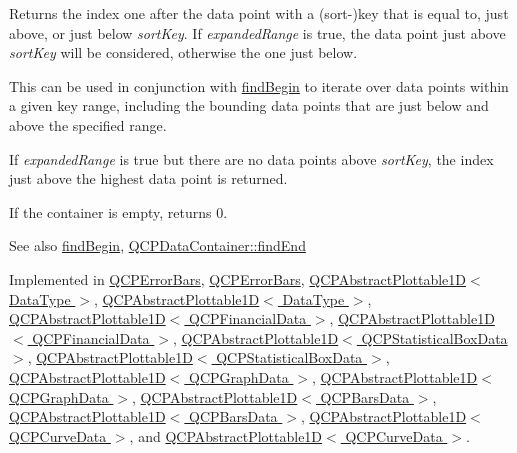 Returns the index one after the data point with a (sort-\/)key that is equal to, just above, or just below {\itshape sort\+Key}. If {\itshape expanded\+Range} is true, the data point just above {\itshape sort\+Key} will be considered, otherwise the one just below.

This can be used in conjunction with \hyperlink{class_q_c_p_plottable_interface1_d_a5b95783271306a4de97be54eac1e7d13}{find\+Begin} to iterate over data points within a given key range, including the bounding data points that are just below and above the specified range.

If {\itshape expanded\+Range} is true but there are no data points above {\itshape sort\+Key}, the index just above the highest data point is returned.

If the container is empty, returns 0.

\begin{DoxySeeAlso}{See also}
\hyperlink{class_q_c_p_plottable_interface1_d_a5b95783271306a4de97be54eac1e7d13}{find\+Begin}, \hyperlink{class_q_c_p_data_container_afb8b8f23cc2b7234a793a25ce79fe48f}{Q\+C\+P\+Data\+Container\+::find\+End} 
\end{DoxySeeAlso}


Implemented in \hyperlink{class_q_c_p_error_bars_a64629f13bb290d41dd8f1b37346bfdd4}{Q\+C\+P\+Error\+Bars}, \hyperlink{class_q_c_p_error_bars_a5a529f3a9e71b6c29f8a0397d570489e}{Q\+C\+P\+Error\+Bars}, \hyperlink{class_q_c_p_abstract_plottable1_d_ad913df7f02add35150779dce3913aeae}{Q\+C\+P\+Abstract\+Plottable1\+D$<$ Data\+Type $>$}, \hyperlink{class_q_c_p_abstract_plottable1_d_a02434e0e5599cd072225692f3469750b}{Q\+C\+P\+Abstract\+Plottable1\+D$<$ Data\+Type $>$}, \hyperlink{class_q_c_p_abstract_plottable1_d_ad913df7f02add35150779dce3913aeae}{Q\+C\+P\+Abstract\+Plottable1\+D$<$ Q\+C\+P\+Financial\+Data $>$}, \hyperlink{class_q_c_p_abstract_plottable1_d_a02434e0e5599cd072225692f3469750b}{Q\+C\+P\+Abstract\+Plottable1\+D$<$ Q\+C\+P\+Financial\+Data $>$}, \hyperlink{class_q_c_p_abstract_plottable1_d_ad913df7f02add35150779dce3913aeae}{Q\+C\+P\+Abstract\+Plottable1\+D$<$ Q\+C\+P\+Statistical\+Box\+Data $>$}, \hyperlink{class_q_c_p_abstract_plottable1_d_a02434e0e5599cd072225692f3469750b}{Q\+C\+P\+Abstract\+Plottable1\+D$<$ Q\+C\+P\+Statistical\+Box\+Data $>$}, \hyperlink{class_q_c_p_abstract_plottable1_d_ad913df7f02add35150779dce3913aeae}{Q\+C\+P\+Abstract\+Plottable1\+D$<$ Q\+C\+P\+Graph\+Data $>$}, \hyperlink{class_q_c_p_abstract_plottable1_d_a02434e0e5599cd072225692f3469750b}{Q\+C\+P\+Abstract\+Plottable1\+D$<$ Q\+C\+P\+Graph\+Data $>$}, \hyperlink{class_q_c_p_abstract_plottable1_d_ad913df7f02add35150779dce3913aeae}{Q\+C\+P\+Abstract\+Plottable1\+D$<$ Q\+C\+P\+Bars\+Data $>$}, \hyperlink{class_q_c_p_abstract_plottable1_d_a02434e0e5599cd072225692f3469750b}{Q\+C\+P\+Abstract\+Plottable1\+D$<$ Q\+C\+P\+Bars\+Data $>$}, \hyperlink{class_q_c_p_abstract_plottable1_d_ad913df7f02add35150779dce3913aeae}{Q\+C\+P\+Abstract\+Plottable1\+D$<$ Q\+C\+P\+Curve\+Data $>$}, and \hyperlink{class_q_c_p_abstract_plottable1_d_a02434e0e5599cd072225692f3469750b}{Q\+C\+P\+Abstract\+Plottable1\+D$<$ Q\+C\+P\+Curve\+Data $>$}.

